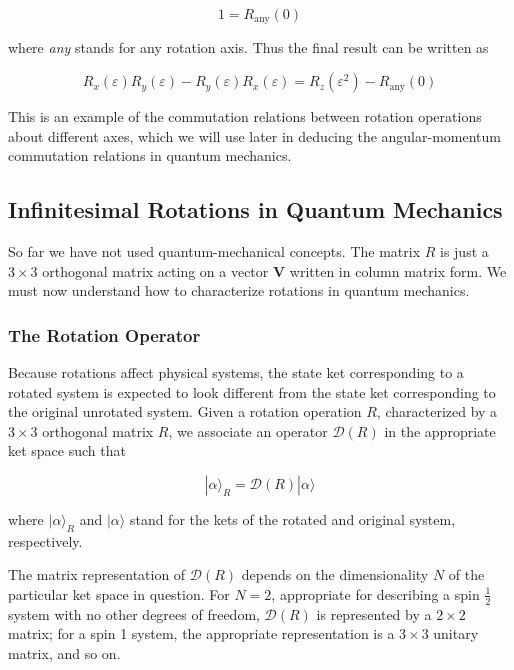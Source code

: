 \documentclass[11pt,a4paper]{article}
\begin{document}
\begin{equation}
1 = R_{\text{any}}(0)
\tag{3.8}
\end{equation}

where \textit{any} stands for any rotation axis. Thus the final result can be written as

\begin{equation}
\boxed{R_x(\varepsilon)R_y(\varepsilon) - R_y(\varepsilon)R_x(\varepsilon) = R_z(\varepsilon^2) - R_{\text{any}}(0)}
\tag{3.9}
\end{equation}

This is an example of the commutation relations between rotation operations about different axes, which we will use later in deducing the angular-momentum commutation relations in quantum mechanics.

\subsection{Infinitesimal Rotations in Quantum Mechanics}

So far we have not used quantum-mechanical concepts. The matrix $R$ is just a $3 \times 3$ orthogonal matrix acting on a vector $\mathbf{V}$ written in column matrix form. We must now understand how to characterize rotations in quantum mechanics.

\subsubsection{The Rotation Operator}

Because rotations affect physical systems, the state ket corresponding to a rotated system is expected to look different from the state ket corresponding to the original unrotated system. Given a rotation operation $R$, characterized by a $3 \times 3$ orthogonal matrix $R$, we associate an operator $\mathscr{D}(R)$ in the appropriate ket space such that

\begin{equation}
\boxed{|\alpha\rangle_R = \mathscr{D}(R)|\alpha\rangle}
\tag{3.10}
\end{equation}

where $|\alpha\rangle_R$ and $|\alpha\rangle$ stand for the kets of the rotated and original system, respectively.

The matrix representation of $\mathscr{D}(R)$ depends on the dimensionality $N$ of the particular ket space in question. For $N = 2$, appropriate for describing a spin $\frac{1}{2}$ system with no other degrees of freedom, $\mathscr{D}(R)$ is represented by a $2 \times 2$ matrix; for a spin 1 system, the appropriate representation is a $3 \times 3$ unitary matrix, and so on.
\end{document}
